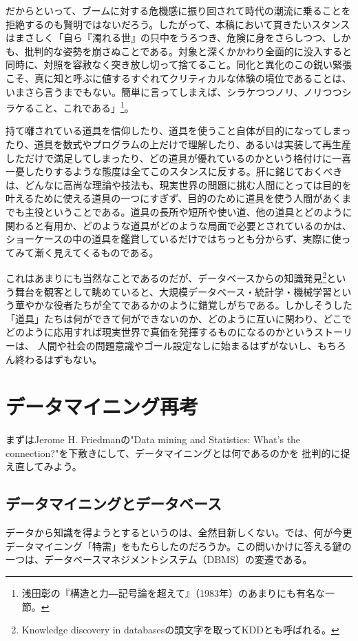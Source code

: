 だからといって、ブームに対する危機感に振り回されて時代の潮流に乗ることを拒絶するのも賢明ではないだろう。したがって、本稿において貫きたいスタンスはまさしく「自ら『濁れる世』の只中をうろつき、危険に身をさらしつつ、しかも、批判的な姿勢を崩さぬことである。対象と深くかかわり全面的に没入すると同時に、対照を容赦なく突き放し切って捨てること。同化と異化のこの鋭い緊張こそ、真に知と呼ぶに値するすぐれてクリティカルな体験の境位であることは、いまさら言うまでもない。簡単に言ってしまえば、シラケつつノリ、ノリつつシラケること、これである」\footnote{浅田彰の『構造と力―記号論を超えて』（1983年）のあまりにも有名な一節。}。

持て囃されている道具を信仰したり、道具を使うこと自体が目的になってしまったり、道具を数式やプログラムの上だけで理解したり、あるいは実装して再生産しただけで満足してしまったり、どの道具が優れているのかという格付けに一喜一憂したりするような態度は全てこのスタンスに反する。肝に銘じておくべきは、どんなに高尚な理論や技法も、現実世界の問題に挑む人間にとっては目的を叶えるために使える道具の一つにすぎず、目的のために道具を使う人間があくまでも主役ということである。道具の長所や短所や使い道、他の道具とどのように関わると有用か、どのような道具がどのような局面で必要とされているのかは、ショーケースの中の道具を鑑賞しているだけではちっとも分からず、実際に使ってみて漸く見えてくるものである。

これはあまりにも当然なことであるのだが、データベースからの知識発見\footnote{Knowledge discovery in databasesの頭文字を取ってKDDとも呼ばれる。}という舞台を観客として眺めていると、大規模データベース・統計学・機械学習という華やかな役者たちが全てであるかのように錯覚しがちである。しかしそうした「道具」たちは何ができて何ができないのか、どのように互いに関わり、どこでどのように応用すれば現実世界で真価を発揮するものになるのかというストーリーは、
人間や社会の問題意識やゴール設定なしに始まるはずがないし、もちろん終わるはずもない。

\section{データマイニング再考}
まずはJerome H. Friedmanの"Data mining and Statistics: What's the connection?"を下敷きにして、データマイニングとは何であるのかを
批判的に捉え直してみよう。

\subsection{データマイニングとデータベース}
データから知識を得ようとするというのは、全然目新しくない。では、何が今更データマイニング「特需」をもたらしたのだろうか。この問いかけに答える鍵の一つは、データベースマネジメントシステム（DBMS）の変遷である。

